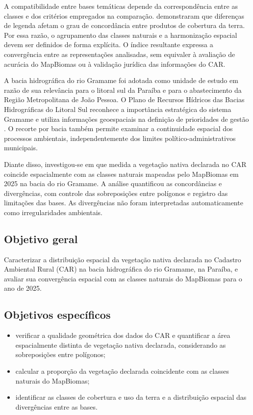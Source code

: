 A compatibilidade entre bases temáticas depende da correspondência entre as classes e dos critérios empregados na comparação.  demonstraram que diferenças de legenda afetam o grau de concordância entre produtos de cobertura da terra. Por essa razão, o agrupamento das classes naturais e a harmonização espacial devem ser definidos de forma explícita. O índice resultante expressa a convergência entre as representações analisadas, sem equivaler à avaliação de acurácia do MapBiomas ou à validação jurídica das informações do CAR.

A bacia hidrográfica do rio Gramame foi adotada como unidade de estudo em razão de sua relevância para o litoral sul da Paraíba e para o abastecimento da Região Metropolitana de João Pessoa. O Plano de Recursos Hídricos das Bacias Hidrográficas do Litoral Sul reconhece a importância estratégica do sistema Gramame e utiliza informações geoespaciais na definição de prioridades de gestão \cite{aesa2025}. O recorte por bacia também permite examinar a continuidade espacial dos processos ambientais, independentemente dos limites político-administrativos municipais.

Diante disso, investigou-se em que medida a vegetação nativa declarada no CAR coincide espacialmente com as classes naturais mapeadas pelo MapBiomas em 2025 na bacia do rio Gramame. A análise quantificou as concordâncias e divergências, com controle das sobreposições entre polígonos e registro das limitações das bases. As divergências não foram interpretadas automaticamente como irregularidades ambientais.

\subsection{Objetivo geral}

Caracterizar a distribuição espacial da vegetação nativa declarada no Cadastro Ambiental Rural (CAR) na bacia hidrográfica do rio Gramame, na Paraíba, e avaliar sua convergência espacial com as classes naturais do MapBiomas para o ano de 2025.

\subsection{Objetivos específicos}

\begin{itemize}
    \item verificar a qualidade geométrica dos dados do CAR e quantificar a área espacialmente distinta de vegetação nativa declarada, considerando as sobreposições entre polígonos;
    \item calcular a proporção da vegetação declarada coincidente com as classes naturais do MapBiomas;
    \item identificar as classes de cobertura e uso da terra e a distribuição espacial das divergências entre as bases.
\end{itemize}

\newpage
